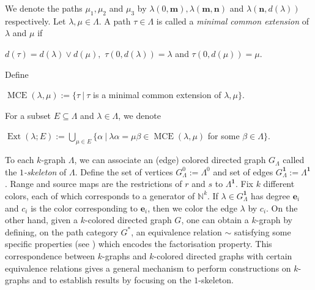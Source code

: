 \documentclass[12pt]{amsart}
\newcommand{\MCE}{\operatorname{MCE}}
\theoremstyle{definition}
\theoremstyle{remark}
\newcommand{\Ext}{\operatorname{Ext}}
\begin{document}
We denote the paths $\mu_1,\mu_2$ and $\mu_3$ by $\lambda(0,\mathbf{m}),\lambda(\mathbf{m},\mathbf{n})$ and $\lambda(\mathbf{n},d(\lambda))$ respectively. Let $\lambda,\mu\in \Lambda$. A path $\tau\in \Lambda$ is called a \emph{minimal common extension} of $\lambda$ and $\mu$ if 

\begin{center}
    $d(\tau)=d(\lambda)\vee d(\mu),$ $\tau(0,d(\lambda))=\lambda$ and $\tau(0,d(\mu))=\mu$.
\end{center}
Define 
\begin{center}
$\MCE(\lambda,\mu):=\{\tau~|~\tau$ is a minimal common extension of $\lambda,\mu\}$.
\end{center}

For a subset $E\subseteq \Lambda$ and $\lambda\in \Lambda$, we denote
\begin{center}
$\Ext(\lambda;E):=\displaystyle{\bigcup_{\mu\in E}} \{\alpha~|~\lambda \alpha=\mu\beta\in \MCE(\lambda,\mu)$ for some $\beta\in \Lambda\}$.
\end{center}

To each $k$-graph $\Lambda$, we can associate an (edge) colored directed graph $G_\Lambda$ called the \emph{$1$-skeleton} of $\Lambda$. Define the set of vertices $G_\Lambda^0:=\Lambda^0$ and set of edges $G_\Lambda^\mathbf{1}:=\Lambda^\mathbf{1}$. Range and source maps are the restrictions of $r$ and $s$ to $\Lambda^\mathbf{1}$. Fix $k$ different colors, each of which corresponds to a generator of $\mathbb{N}^k$. If $\lambda\in G_\Lambda^\mathbf{1}$ has degree $\mathbf{e}_i$ and $c_i$ is the color corresponding to $\mathbf{e}_i$, then we color the edge $\lambda$ by $c_i$. On the other hand, given a $k$-colored directed graph $G$, one can obtain a $k$-graph by defining, on the path category $G^*$, an equivalence relation $\sim$ satisfying some specific properties (see \cite[Theorems 4.4 and  4.5]{Hazlewood}) which encodes the factorisation property. This correspondence between $k$-graphs and $k$-colored directed graphs with certain equivalence relations gives a general mechanism to perform constructions on $k$-graphs and to establish results by focusing on the $1$-skeleton.
\end{document}
